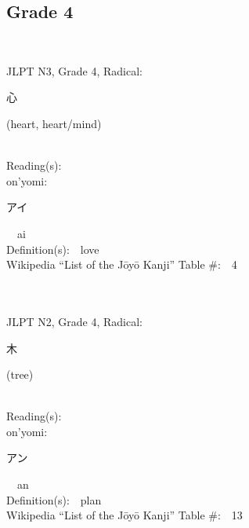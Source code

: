 \subsection*{Grade 4 }
  \label{P1-4}
\begin{multicols}{2}
{\fontsize{34pt}{40pt}  }\ \ \\  %
{JLPT N3, Grade 4, Radical:\ \ {\begin{CJK}{UTF8}{min} 心 \end{CJK}} (heart, heart/mind) } \\
Reading(s):\ \ \\
{\hspace*{1em}}on'yomi:\ \ \\
{\hspace*{2em}}{\begin{CJK}{UTF8}{min} アイ \end{CJK}}\ \ ai\ \ \\
Definition(s):\ \ love \\
Wikipedia ``List of the J\=oy\=o Kanji'' Table \#:\ \ 4 \\
\ \ \\
{\fontsize{34pt}{40pt}  }\ \ \\  %
{JLPT N2, Grade 4, Radical:\ \ {\begin{CJK}{UTF8}{min} 木 \end{CJK}} (tree) } \\
Reading(s):\ \ \\
{\hspace*{1em}}on'yomi:\ \ \\
{\hspace*{2em}}{\begin{CJK}{UTF8}{min} アン \end{CJK}}\ \ an\ \ \\
Definition(s):\ \ plan \\
Wikipedia ``List of the J\=oy\=o Kanji'' Table \#:\ \ 13 \\
\ \ \\
{\fontsize{34pt}{40pt}  }\ \ \\  %

\end{multicols}
